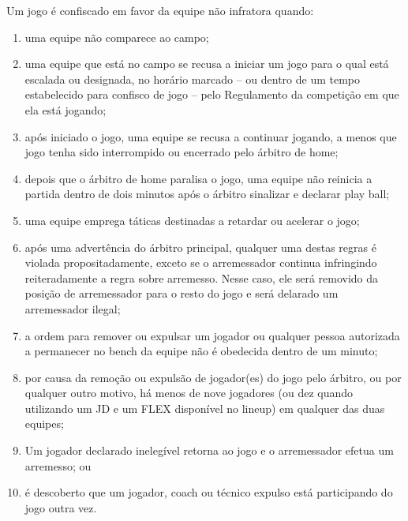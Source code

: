 Um jogo é confiscado em favor da equipe não infratora quando:
\begin{enumerate}[label=(\alph*)]
	\item uma equipe não comparece ao campo;
	\item  uma equipe que está no campo se recusa a iniciar um jogo para o qual está escalada ou designada, no horário marcado -- ou dentro de um tempo estabelecido para confisco de jogo -- pelo Regulamento da competição em que ela está jogando;
	\item  após iniciado o jogo, uma equipe se recusa a continuar jogando, a menos que jogo tenha sido interrompido ou encerrado pelo árbitro de \gls{home};
	\item  depois que o árbitro de \gls{home} paralisa o jogo, uma equipe não reinicia a  partida dentro de dois minutos após o árbitro sinalizar e declarar \gls{play ball};
	\item  uma equipe emprega táticas destinadas a retardar ou acelerar o jogo;
	\item  após uma advertência do árbitro principal, qualquer uma destas regras é violada propositadamente, exceto se o arremessador continua infringindo reiteradamente a regra sobre arremesso. Nesse caso, ele será removido da  posição de arremessador para o resto do jogo e será delarado um arremessador ilegal;
	\item  a ordem para remover ou expulsar um jogador ou qualquer pessoa autorizada  a permanecer no \gls{bench} da equipe não é obedecida dentro de um minuto;
	\item  por causa da remoção ou expulsão de jogador(es) do jogo pelo árbitro, ou por qualquer outro motivo, há menos de nove jogadores (ou dez quando utilizando um JD e um FLEX disponível no \gls{lineup}) em qualquer das duas equipes;
	\item  Um jogador declarado inelegível retorna ao jogo e o arremessador efetua um arremesso; ou
	\item  é descoberto que um jogador, \gls{coach} ou técnico expulso está participando do jogo outra vez.
\end{enumerate}


